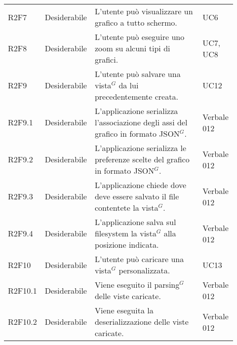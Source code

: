{\begin{longtable}{p{0.12\linewidth}p{0.15\linewidth}p{0.50\linewidth}p{0.15\linewidth}}
    \rowcolor[RGB]{233, 245, 206}
    R2F7 & Desiderabile & L'utente può visualizzare un grafico a tutto schermo. & UC6\\
    \rowcolor[RGB]{233, 245, 206}
    R2F8 & Desiderabile & L'utente può eseguire uno zoom su alcuni tipi di grafici. & UC7, UC8\\
    \rowcolor[RGB]{216, 235, 171}
    R2F9 & Desiderabile & L'utente può salvare una vista$^{G}$ da lui precedentemente creata. & UC12\\
    \rowcolor[RGB]{233, 245, 206}
    R2F9.1 & Desiderabile & L'applicazione serializza l'associazione degli assi del grafico in formato JSON$^{G}$.& Verbale 012 \\
    \rowcolor[RGB]{216, 235, 171}
    R2F9.2 & Desiderabile & L'applicazione serializza le preferenze scelte del grafico in formato JSON$^{G}$.& Verbale 012 \\
    \rowcolor[RGB]{233, 245, 206}
    R2F9.3 & Desiderabile & L'applicazione chiede dove deve essere salvato il file  contentete la vista$^{G}$.& Verbale 012 \\
    \rowcolor[RGB]{216, 235, 171}
    R2F9.4 & Desiderabile & L'applicazione salva sul filesystem la vista$^{G}$ alla posizione indicata.& Verbale 012 \\

    \rowcolor[RGB]{233, 245, 206}
    R2F10 & Desiderabile & L'utente può caricare una vista$^{G}$ personalizzata.  & UC13\\
    \rowcolor[RGB]{216, 235, 171}
    R2F10.1 & Desiderabile & Viene eseguito il parsing$^{G}$ delle viste caricate. & Verbale 012 \\
    \rowcolor[RGB]{233, 245, 206}
    R2F10.2 & Desiderabile & Viene eseguita la deserializzazione delle viste caricate. & Verbale 012 \\


\end{longtable}}
